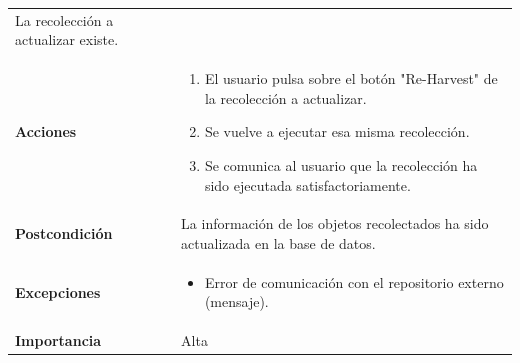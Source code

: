 \documentclass[
]{article}
\providecommand{\tightlist}{%
  \setlength{\itemsep}{0pt}\setlength{\parskip}{0pt}}
\begin{document}
\begin{longtable}[]{@{}ll@{}}
\begin{minipage}[t]{0.72\columnwidth}
La recolección a actualizar existe.\strut
\end{minipage}\tabularnewline
\begin{minipage}[t]{0.22\columnwidth}\raggedright
\textbf{Acciones}\strut
\end{minipage} & \begin{minipage}[t]{0.72\columnwidth}\raggedright
\begin{enumerate}
\def\labelenumi{\arabic{enumi}.}
\tightlist
\item
  El usuario pulsa sobre el botón "Re-Harvest" de la recolección a
  actualizar.
\item
  Se vuelve a ejecutar esa misma recolección.
\item
  Se comunica al usuario que la recolección ha sido ejecutada
  satisfactoriamente.
\end{enumerate}\strut
\end{minipage}\tabularnewline
\begin{minipage}[t]{0.22\columnwidth}\raggedright
\textbf{Postcondición}\strut
\end{minipage} & \begin{minipage}[t]{0.72\columnwidth}\raggedright
La información de los objetos recolectados ha sido actualizada en la
base de datos.\strut
\end{minipage}\tabularnewline
\begin{minipage}[t]{0.22\columnwidth}\raggedright
\textbf{Excepciones}\strut
\end{minipage} & \begin{minipage}[t]{0.72\columnwidth}\raggedright
\begin{itemize}
\tightlist
\item
  Error de comunicación con el repositorio externo (mensaje).
\end{itemize}\strut
\end{minipage}\tabularnewline
\begin{minipage}[t]{0.22\columnwidth}\raggedright
\textbf{Importancia}\strut
\end{minipage} & \begin{minipage}[t]{0.72\columnwidth}\raggedright
Alta\strut
\end{minipage}\tabularnewline
\bottomrule
\end{longtable}
\end{document}
